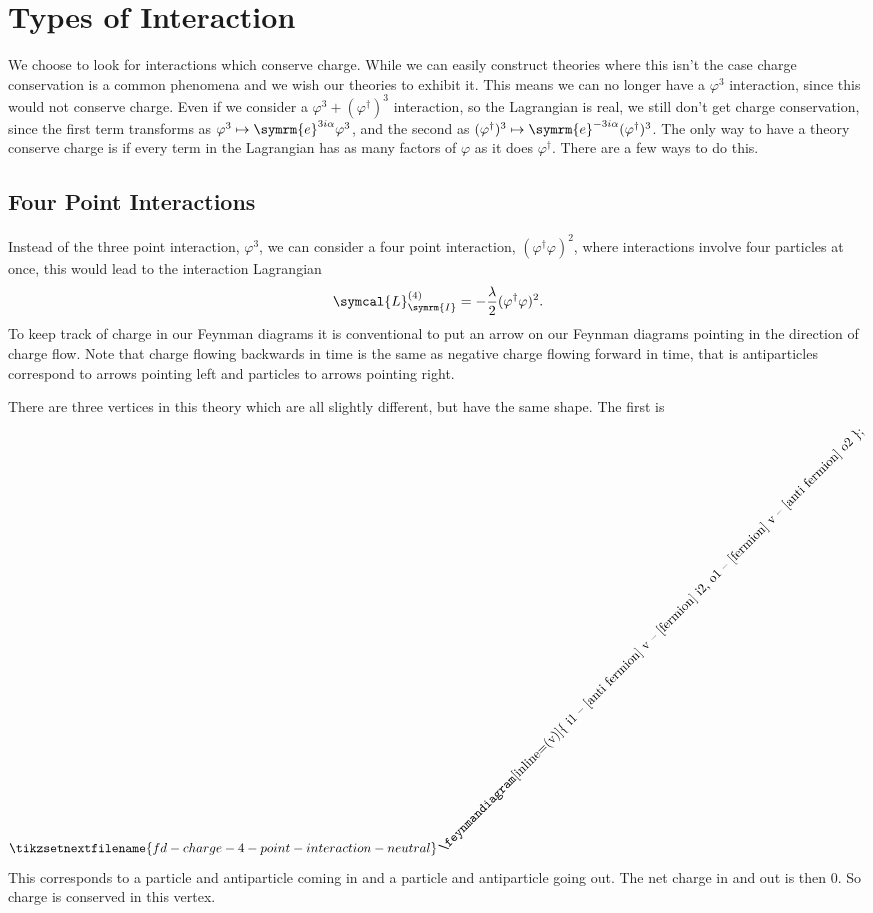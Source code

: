 \documentclass[fleqn]{NotesClass}
\newcommand{\e}{\symrm{e}}
\newcommand{\lagrangianDensity}{\symcal{L}}
\newcommand{\hermit}{{\dagger}}
\newcommand{\interaction}{\symrm{I}}
\begin{document}
    \section{Types of Interaction}
    We choose to look for interactions which conserve charge.
    While we can easily construct theories where this isn't the case charge conservation is a common phenomena and we wish our theories to exhibit it.
    This means we can no longer have a \(\varphi^3\) interaction, since this would not conserve charge.
    Even if we consider a \(\varphi^3 + (\varphi^\hermit)^3\) interaction, so the Lagrangian is real, we still don't get charge conservation, since the first term transforms as \(\varphi^3 \mapsto \e^{3i\alpha}\varphi^3\), and the second as \((\varphi^{\hermit})^3 \mapsto \e^{-3i\alpha}(\varphi^\hermit)^3\).
    The only way to have a theory conserve charge is if every term in the Lagrangian has as many factors of \(\varphi\) as it does \(\varphi^\hermit\).
    There are a few ways to do this.
    
    \subsection{Four Point Interactions}
    Instead of the three point interaction, \(\varphi^3\), we can consider a four point interaction, \((\varphi^\hermit\varphi)^2\), where interactions involve four particles at once, this would lead to the interaction Lagrangian
    \begin{equation}
        \lagrangianDensity_{\interaction}^{(4)} = -\frac{\lambda}{2}(\varphi^\hermit \varphi)^2.
    \end{equation}
    To keep track of charge in our Feynman diagrams it is conventional to put an arrow on our Feynman diagrams pointing in the direction of charge flow.
    Note that charge flowing backwards in time is the same as negative charge flowing forward in time, that is antiparticles correspond to arrows pointing left and particles to arrows pointing right.
    
    There are three vertices in this theory which are all slightly different, but have the same shape.
    The first is
    \begin{equation}
        \tikzsetnextfilename{fd-charge-4-point-interaction-neutral}
        \rotatebox{45}{\feynmandiagram[inline=(v)]{
                i1 -- [anti fermion] v -- [fermion] i2,
                o1 -- [fermion] v -- [anti fermion] o2
            };}
    \end{equation}
    This corresponds to a particle and antiparticle coming in and a particle and antiparticle going out.
    The net charge in and out is then 0.
    So charge is conserved in this vertex.
    
\end{document}

